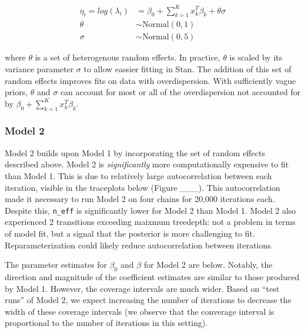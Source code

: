 \documentclass[
]{article}
\begin{document}
\[
\begin{aligned}
\eta_i = log(\lambda_i) & = \beta_0 + \sum_{k=1}^{K}x_k^T\beta_k + \theta\sigma \\
\theta &\sim \text{Normal}(0, 1) \\
\sigma &\sim \text{Normal}(0, 5)
\end{aligned}
\]

where \(\theta\) is a set of heterogenous random effects. In practice,
\(\theta\) is scaled by its variance parameter \(\sigma\) to allow
eassier fitting in Stan. The addition of this set of random effects
improves fits on data with overdispersion. With sufficiently vague
priors, \(\theta\) and \(\sigma\) can account for most or all of the
overdispersion not accounted for by
\(\beta_0 + \sum_{k=1}^{K}x_k^T\beta_k\).

\hypertarget{model-2}{%
\subsubsection{Model 2}\label{model-2}}

Model 2 builds upon Model 1 by incorporating the set of random effects
described above. Model 2 is \emph{significantly} more computationally
expensive to fit than Model 1. This is due to relatively large
autocorrelation between each iteration, visible in the traceplots below
(Figure \_\_\_). This autocorrelation made it necessary to run Model 2
on four chains for 20,000 iterations each. Despite this, \texttt{n\_eff}
is significantly lower for Model 2 than Model 1. Model 2 also
experienced 2 transitions exceeding maixmum treedepth: not a problem in
terms of model fit, but a signal that the posterior is more challenging
to fit. Reparameterization could likely reduce autocorrelation between
iterations.

The parameter estimates for \(\beta_0\) and \(\beta\) for Model 2 are
below. Notably, the direction and magnitude of the coefficient estimates
are similar to those produced by Model 1. However, the coverage
intervals are much wider. Based on ``test runs'' of Model 2, we expect
increasing the number of iterations to decrease the width of these
coverage intervals (we observe that the converage interval is
proportional to the number of iterations in this setting).
\end{document}
